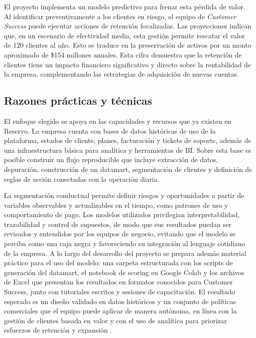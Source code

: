 El proyecto implementa un modelo predictivo para frenar esta pérdida de valor. Al identificar preventivamente a los clientes en riesgo, el equipo de \textit{Customer Success} puede ejecutar acciones de retención focalizadas. Las proyecciones indican que, en un escenario de efectividad media, esta gestión permite rescatar el valor de 120 clientes al año. Esto se traduce en la preservación de activos por un monto aproximado de \$154 millones anuales. Esta cifra demuestra que la retención de clientes tiene un impacto financiero significativo y directo sobre la rentabilidad de la empresa, complementando las estrategias de adquisición de nuevas cuentas.

\subsection{Razones prácticas y técnicas}

El enfoque elegido se apoya en las capacidades y recursos que ya existen en Reservo. La empresa cuenta con bases de datos históricas de uso de la plataforma, estados de cliente, planes, facturación y tickets de soporte, además de una infraestructura básica para analítica y herramientas de BI. Sobre esta base es posible construir un flujo reproducible que incluye extracción de datos, depuración, construcción de un datamart, segmentación de clientes y definición de reglas de acción conectadas con la operación diaria.

La segmentación conductual permite definir riesgos y oportunidades a partir de variables observables y actualizables en el tiempo, como patrones de uso y comportamiento de pago. Los modelos utilizados privilegian interpretabilidad, trazabilidad y control de supuestos, de modo que sus resultados puedan ser revisados y entendidos por los equipos de negocio, evitando que el modelo se perciba como una caja negra y favoreciendo su integración al lenguaje cotidiano de la empresa. A lo largo del desarrollo del proyecto se prepara además material práctico para el uso del modelo: una carpeta estructurada con los scripts de generación del datamart, el notebook de scoring en Google Colab y los archivos de Excel que presentan los resultados en formatos conocidos para Customer Success, junto con tutoriales escritos y sesiones de capacitación. El resultado esperado es un diseño validado en datos históricos y un conjunto de políticas comerciales que el equipo puede aplicar de manera autónoma, en línea con la gestión de clientes basada en valor y con el uso de analítica para priorizar esfuerzos de retención y expansión \citep{Kumar2010}.


